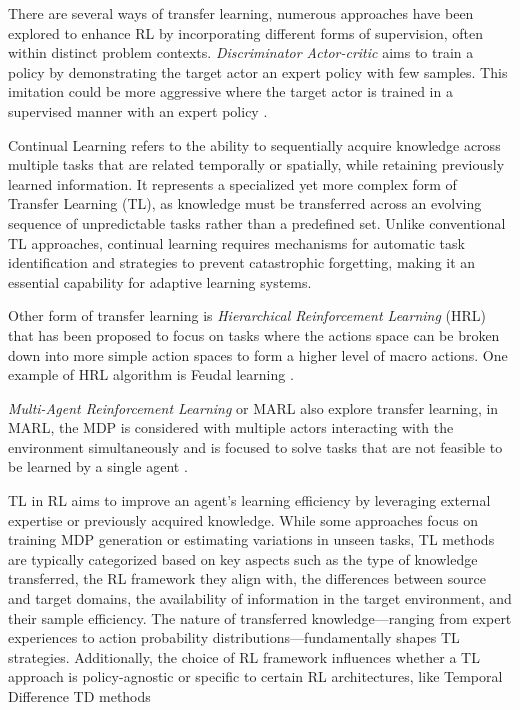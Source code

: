 There are several ways of transfer learning, numerous approaches have been explored to enhance RL by incorporating different forms of supervision, often within distinct problem contexts. \emph{Discriminator Actor-critic} \cite{imitation_learning} aims to train a policy by demonstrating the target actor an expert policy with few samples. This imitation could be more aggressive where the target actor is trained in a supervised manner with an expert policy \cite{imitation_learning_supervised}.

Continual Learning refers to the ability to sequentially acquire knowledge across multiple tasks that are related temporally or spatially, while retaining previously learned information. It represents a specialized yet more complex form of Transfer Learning (TL), as knowledge must be transferred across an evolving sequence of unpredictable tasks rather than a predefined set. Unlike conventional TL approaches, continual learning requires mechanisms for automatic task identification and strategies to prevent catastrophic forgetting, making it an essential capability for adaptive learning systems.

Other form of transfer learning is \emph{Hierarchical Reinforcement Learning} (HRL) that has been proposed to focus on tasks where the actions space can be broken down into more simple action spaces to form a higher level of macro actions. One example of HRL algorithm is Feudal learning \cite{feudal_rd}.

\emph{Multi-Agent Reinforcement Learning} or MARL also explore transfer learning, in MARL, the MDP is considered with multiple actors interacting with the environment simultaneously and is focused to solve tasks that are not feasible to be learned by a single agent \cite{multi_agent_rl}.

TL in RL aims to improve an agent's learning efficiency by leveraging external expertise or previously acquired knowledge. While some approaches focus on training MDP generation or estimating variations in unseen tasks, TL methods are typically categorized based on key aspects such as the type of knowledge transferred, the RL framework they align with, the differences between source and target domains, the availability of information in the target environment, and their sample efficiency. The nature of transferred knowledge—ranging from expert experiences to action probability distributions—fundamentally shapes TL strategies. Additionally, the choice of RL framework influences whether a TL approach is policy-agnostic or specific to certain RL architectures, like Temporal Difference TD methods \cite{TL_survey}

